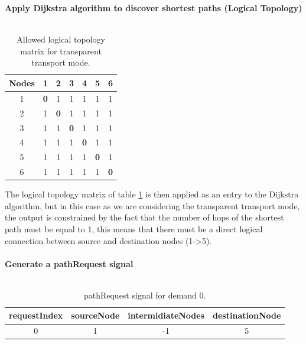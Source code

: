 \textbf{Apply Dijkstra algorithm to discover shortest paths (Logical Topology)}\\ \\
\begin{table}[H]
	\centering	
	\begin{tabular}{|c|c|c|c|c|c|c|}
		\hline
		\multicolumn{1}{|l|}{\textbf{Nodes}} & 1   & 2   & 3   & 4   & 5   & 6  \\ \hline
		1                           & \textbf{0}   & 1 & 1 & 1 & 1 & 1 \\ \hline
		2                           & 1 & \textbf{0}   & 1 & 1 & 1 & 1 \\ \hline
		3                           & 1 & 1 & \textbf{0}   & 1 & 1 & 1 \\ \hline
		4                           & 1 & 1 & 1 & \textbf{0}   & 1 & 1 \\ \hline
		5                           & 1 & 1 & 1 & 1 & \textbf{0}   & 1 \\ \hline
		6                           & 1 & 1 & 1 & 1 & 1 & \textbf{0}   \\ \hline
	\end{tabular}
	\caption{Allowed logical topology matrix for transparent transport mode.}
	\label{Transparentlogical_topology}
\end{table}

The logical topology matrix of table \ref{Transparentlogical_topology} is then applied as an entry to the Dijkstra algorithm, but in this case as we are considering the transparent transport mode, the output is constrained by the fact that the number of hops of the shortest path must be equal to 1, this means that there must be a direct logical connection between source and destination nodes (1->5).\\ \\

\textbf{Generate a pathRequest signal}\\ \\

\begin{table}[H]
	\centering
	\begin{tabular}{|c|c|c|c|}
		\hline
		requestIndex & sourceNode & intermidiateNodes & destinationNode \\ \hline
		0            & 1          & -1                 & 5               \\ \hline
	\end{tabular}
	\caption{pathRequest signal for demand 0.}
\end{table} 

